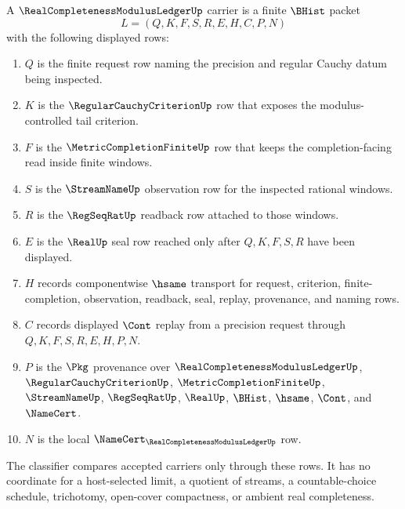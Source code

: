 \begin{definition}
\label{def:real-completeness-modulus-ledger-carrier}
A $\RealCompletenessModulusLedgerUp$ carrier is a finite $\BHist$ packet
$$
L=(Q,K,F,S,R,E,H,C,P,N)
$$
with the following displayed rows:
\begin{enumerate}
\item $Q$ is the finite request row naming the precision and regular Cauchy datum being inspected.
\item $K$ is the $\RegularCauchyCriterionUp$ row that exposes the modulus-controlled tail criterion.
\item $F$ is the $\MetricCompletionFiniteUp$ row that keeps the completion-facing read inside finite windows.
\item $S$ is the $\StreamNameUp$ observation row for the inspected rational windows.
\item $R$ is the $\RegSeqRatUp$ readback row attached to those windows.
\item $E$ is the $\RealUp$ seal row reached only after $Q,K,F,S,R$ have been displayed.
\item $H$ records componentwise $\hsame$ transport for request, criterion, finite-completion, observation, readback, seal, replay, provenance, and naming rows.
\item $C$ records displayed $\Cont$ replay from a precision request through $Q,K,F,S,R,E,H,P,N$.
\item $P$ is the $\Pkg$ provenance over $\RealCompletenessModulusLedgerUp$, $\RegularCauchyCriterionUp$, $\MetricCompletionFiniteUp$, $\StreamNameUp$, $\RegSeqRatUp$, $\RealUp$, $\BHist$, $\hsame$, $\Cont$, and $\NameCert$.
\item $N$ is the local $\NameCert_{\RealCompletenessModulusLedgerUp}$ row.
\end{enumerate}
The classifier compares accepted carriers only through these rows. It has no coordinate for a host-selected limit, a quotient of streams, a countable-choice schedule, trichotomy, open-cover compactness, or ambient real completeness.
\end{definition}

